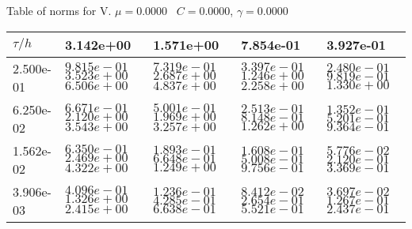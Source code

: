 \begin{center}
Table of norms for V. $\mu = 0.0000$ \, $C = 0.0000$, $\gamma = 0.0000$
  
\begin{tabular}{|p{1in}|p{1in}|p{1in}|p{1in}|p{1in}|} \hline
$\tau / h$ &3.142e+00 &1.571e+00 &7.854e-01 &3.927e-01 \\ \hline 
2.500e-01 & $9.815e-01$  $3.523e+00$  $6.506e+00$  & $7.319e-01$  $2.687e+00$  $4.837e+00$  & $3.397e-01$  $1.246e+00$  $2.258e+00$  & $2.480e-01$  $9.819e-01$  $1.330e+00$  \\ \hline 
6.250e-02 & $6.671e-01$  $2.120e+00$  $3.543e+00$  & $5.001e-01$  $1.969e+00$  $3.257e+00$  & $2.513e-01$  $8.148e-01$  $1.262e+00$  & $1.352e-01$  $5.201e-01$  $9.364e-01$  \\ \hline 
1.562e-02 & $6.350e-01$  $2.469e+00$  $4.322e+00$  & $1.893e-01$  $6.648e-01$  $1.249e+00$  & $1.608e-01$  $5.008e-01$  $9.756e-01$  & $5.776e-02$  $2.120e-01$  $3.369e-01$  \\ \hline 
3.906e-03 & $4.096e-01$  $1.326e+00$  $2.415e+00$  & $1.236e-01$  $4.285e-01$  $6.638e-01$  & $8.412e-02$  $2.654e-01$  $5.521e-01$  & $3.697e-02$  $1.267e-01$  $2.437e-01$  \\ \hline 

\end{tabular}\\[20pt]
\end{center}

